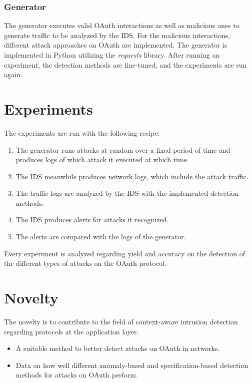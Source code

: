 \documentclass{article}
\begin{document}
\subsubsection{Generator}
The generator executes valid OAuth interactions as well as malicious ones to generate traffic to be analyzed by the IDS. For the malicious interactions, different attack approaches on OAuth are implemented. The generator is implemented in Python utilizing the \emph{requests} library. After running an experiment, the detection methods are fine-tuned, and the experiments are run again.

\section{Experiments}
The experiments are run with the following recipe:
\begin{enumerate}
    \item The generator runs attacks at random over a fixed period of time and produces logs of which attack it executed at which time.
    \item The IDS meanwhile produces network logs, which include the attack traffic.
    \item The traffic logs are analyzed by the IDS with the implemented detection methods.
    \item The IDS produces alerts for attacks it recognized.
    \item The alerts are compared with the logs of the generator.
\end{enumerate}
Every experiment is analyzed regarding yield and accuracy on the detection of the different types of attacks on the OAuth protocol.

\section{Novelty}
The novelty is to contribute to the field of context-aware intrusion detection regarding protocols at the application layer.
\begin{itemize}
    \item A suitable method to better detect attacks on OAuth in networks.
    \item Data on how well different anomaly-based and specification-based detection methods for attacks on OAuth perform.
\end{itemize}




\end{document}
